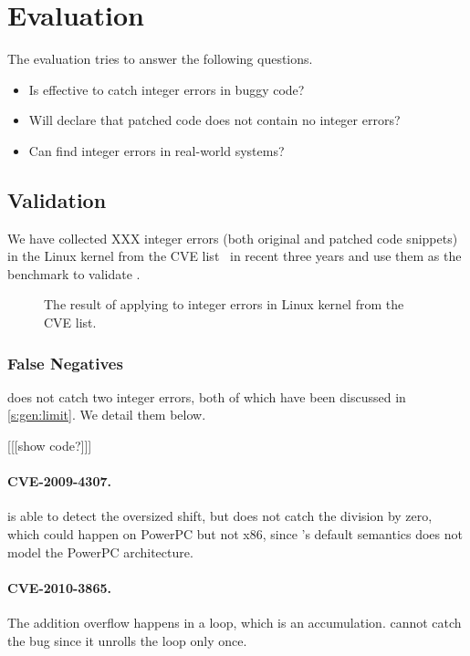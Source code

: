 \section{Evaluation}
\label{s:eval}

The evaluation tries to answer the following questions.
\begin{itemize}
\item
Is \sys effective to catch integer errors in buggy code?
\item
Will \sys declare that patched code does not contain no integer errors?
\item
Can \sys find integer errors in real-world systems?
\end{itemize}

\subsection{Validation}

We have collected XXX integer errors (both original and patched
code snippets) in the Linux kernel from the CVE list~\cite{cve} in
recent three years and use them as the benchmark to validate \sys.

\newcommand{\ok}{\textcolor{JungleGreen}{\checkmark}\xspace}
\newcommand{\checked}{$\boxtimes$}
\begin{figure*}
\centering
\footnotesize

\caption{The result of applying \sys to integer errors in Linux
kernel from the CVE list.}
\end{figure*}

\subsubsection{False Negatives}

\sys does not catch two integer errors, both of which have been
discussed in \autoref{s:gen:limit}.  We detail them below.

[[[show code?]]]

\paragraph{CVE-2009-4307.}
\sys is able to detect the oversized shift, but does not catch the
division by zero, which could happen on PowerPC but not x86, since
\sys's default semantics does not model the PowerPC architecture.

\paragraph{CVE-2010-3865.}
The addition overflow happens in a loop, which is an accumulation.
\sys cannot catch the bug since it unrolls the loop only once.

